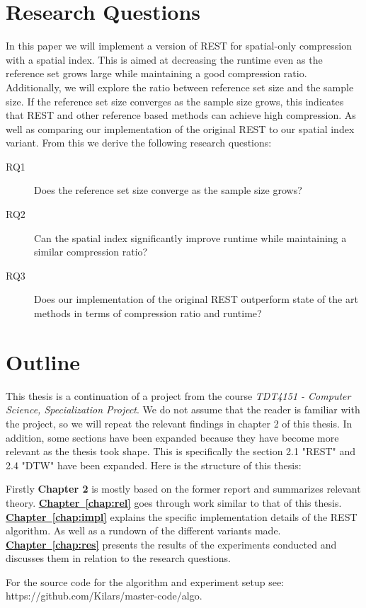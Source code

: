 \section{Research Questions}
In this paper we will implement a version of REST for spatial-only compression with a spatial index. This is aimed at decreasing the runtime even as the reference set grows large while maintaining a good compression ratio. Additionally, we will explore the ratio between reference set size and the sample size. If the reference set size converges as the sample size grows, this indicates that REST and other reference based methods can achieve high compression. As well as comparing our implementation of the original REST to our spatial index variant. From this we derive the following research questions:

\begin{description}
    \item[RQ1] Does the reference set size converge as the sample size grows?
    \item[RQ2] Can the spatial index significantly improve runtime while maintaining a similar compression ratio?
    \item[RQ3] Does our implementation of the original REST outperform state of the art methods in terms of compression ratio and runtime?
\end{description}

\section{Outline}
This thesis is a continuation of a project from the course \textit{TDT4151 - Computer Science, Specialization Project}. We do not assume that the reader is familiar with the project, so we will repeat the relevant findings in chapter 2 of this thesis. In addition, some sections have been expanded because they have become more relevant as the thesis took shape. This is specifically the section 2.1 "REST" and 2.4 "DTW" have been expanded. Here is the structure of this thesis:

Firstly \textbf{Chapter 2} is mostly based on the former report and summarizes relevant theory.
\newline
\textbf{\hyperref[chap:impl]{Chapter~\ref*{chap:rel}}} goes through work similar to that of this thesis.
\newline
\textbf{\hyperref[chap:impl]{Chapter~\ref*{chap:impl}}} explains the specific implementation details of the REST algorithm. As well as a rundown of the different variants made.
\newline
\textbf{\hyperref[chap:impl]{Chapter~\ref*{chap:res}}} presents the results of the experiments conducted and discusses them in relation to the research questions.

For the source code for the algorithm and experiment setup see:\\ https://github.com/Kilars/master-code/algo.

